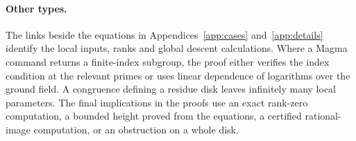 \paragraph{Other types.} The links beside the equations in Appendices~\ref{app:cases} and~\ref{app:details} identify the local inputs, ranks and global descent calculations. Where a Magma command returns a finite-index subgroup, the proof either verifies the index condition at the relevant primes or uses linear dependence of logarithms over the ground field. A congruence defining a residue disk leaves infinitely many local parameters. The final implications in the proofs use an exact rank-zero computation, a bounded height proved from the equations, a certified rational-image computation, or an obstruction on a whole disk.
